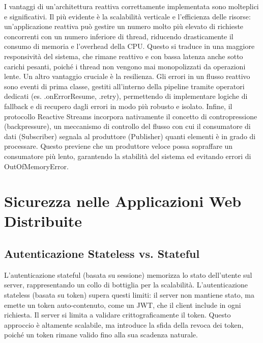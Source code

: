 \documentclass[12pt,a4paper,openright,twoside]{book}
\begin{document}
I vantaggi di un'architettura reattiva correttamente implementata sono molteplici e significativi. Il più evidente è la scalabilità verticale e l'efficienza delle risorse: un'applicazione reattiva può gestire un numero molto più elevato di richieste concorrenti con un numero inferiore di thread, riducendo drasticamente il consumo di memoria e l'overhead della CPU. Questo si traduce in una maggiore responsività del sistema, che rimane reattivo e con bassa latenza anche sotto carichi pesanti, poiché i thread non vengono mai monopolizzati da operazioni lente. Un altro vantaggio cruciale è la resilienza. Gli errori in un flusso reattivo sono eventi di prima classe, gestiti all'interno della pipeline tramite operatori dedicati (es. .onErrorResume, .retry), permettendo di implementare logiche di fallback e di recupero dagli errori in modo più robusto e isolato. Infine, il protocollo Reactive Streams incorpora nativamente il concetto di contropressione (backpressure), un meccanismo di controllo del flusso con cui il consumatore di dati (Subscriber) segnala al produttore (Publisher) quanti elementi è in grado di processare. Questo previene che un produttore veloce possa sopraffare un consumatore più lento, garantendo la stabilità del sistema ed evitando errori di OutOfMemoryError.


\section{Sicurezza nelle Applicazioni Web Distribuite}

\subsection{Autenticazione Stateless vs. Stateful}
L'autenticazione stateful (basata su sessione) memorizza lo stato dell'utente sul server, rappresentando un collo di bottiglia per la scalabilità. L'autenticazione stateless (basata su token) supera questi limiti: il server non mantiene stato, ma emette un token auto-contenuto, come un JWT, che il client include in ogni richiesta. Il server si limita a validare crittograficamente il token. Questo approccio è altamente scalabile, ma introduce la sfida della revoca dei token, poiché un token rimane valido fino alla sua scadenza naturale.
\end{document}

